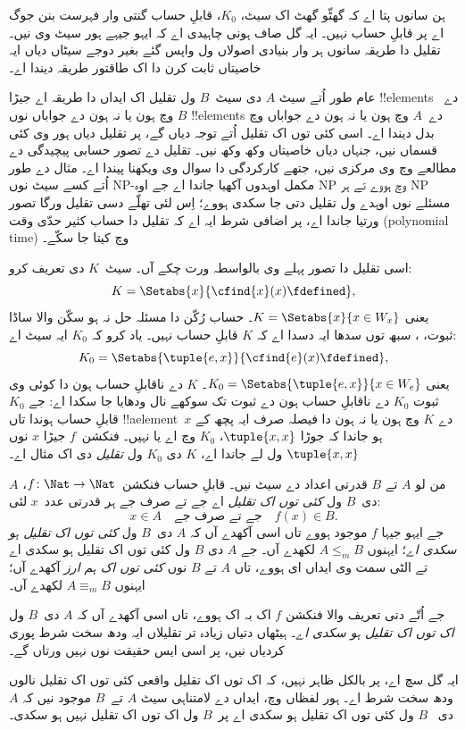 \documentclass[../../../include/open-logic-section]{subfiles}
\begin{document}

\begin{explain}
ہن سانوں پتا اے کہ گھٹّو گھٹ اک سیٹ،
$K_0$، قابلِ حساب گنتی وار فہرست بنن جوگ
اے پر قابلِ حساب نہیں۔ ایہ گل صاف ہونی
چاہیدی اے کہ ایہو جیہے ہور سیٹ وی نیں۔ تقلیل دا طریقہ
سانوں ہر وار بنیادی اصولاں ول واپس گئے
بغیر دوجے سیٹاں دیاں ایہ خاصیتاں ثابت
کرن دا اک طاقتور طریقہ دیندا اے۔

عام طور اُتے سیٹ $A$ دی سیٹ~$B$ ول
تقلیل اک ایداں دا طریقہ اے جیڑا
!!{element}s دے~$B$ وچ ہون یا نہ ہون
دے جواباں نوں !!{element}s دے~$A$ وچ ہون
یا نہ ہون دے جواباں وچ بدل دیندا اے۔
اسی کئی توں اک تقلیل اُتے توجہ
دیاں گے، پر تقلیل دیاں ہور وی کئی قسماں
نیں، جنہاں دیاں خاصیتاں وکھ وکھ نیں۔
تقلیل دے تصور حسابی پیچیدگی دے مطالعے
وچ وی مرکزی نیں، جتھے کارکردگی دا سوال
وی ویکھنا پیندا اے۔ مثال دے طور اُتے
کسے سیٹ نوں NP-مکمل اوہدوں آکھیا
جاندا اے جے اوہ NP وچ ہووے تے ہر NP
مسئلے نوں اوہدے ول تقلیل دتی جا سکدی
ہووے؛ اِس لئی تھلّے دسی تقلیل ورگا
تصور ورتیا جاندا اے، پر اضافی شرط ایہ
اے کہ تقلیل دا حساب کثیر حدّی وقت
(polynomial time) وچ کیتا جا سکّے۔

اسی تقلیل دا تصور پہلے وی بالواسطہ
ورت چکے آں۔ سیٹ~$K$ دی تعریف کرو:
\[
K = \Setabs{x}{\cfind{x}(x) \fdefined},
\]
یعنی $K = \Setabs{x}{x \in W_x}$۔
حساب رُکّن دا مسئلہ حل نہ ہو سکّن
والا ساڈا ثبوت، ،
سبھ توں سدھا ایہ دسدا اے کہ $K$ قابلِ
حساب نہیں۔ یاد کرو کہ $K_0$ ایہ سیٹ اے:
\[
K_0 = \Setabs{\tuple{e, x}}{\cfind{e}(x) \fdefined },
\]
یعنی $K_0 = \Setabs{\tuple{e,x}}{x \in W_e}$۔
$K$ دے ناقابلِ حساب ہون دا کوئی وی
ثبوت $K_0$ دے ناقابلِ حساب ہون دے
ثبوت تک سوکھے نال ودھایا جا سکدا اے:
جے $K_0$ قابلِ حساب ہوندا تاں
!!a{element}~$x$ دے $K$ وچ ہون
یا نہ ہون دا فیصلہ صرف ایہ پچھ کے
ہو جاندا کہ جوڑا $\tuple{x, x}$،
$K_0$ وچ اے یا نہیں۔ فنکشن~$f$
جیڑا $x$ نوں $\tuple{x, x}$ ول
لے جاندا اے، $K$ دی $K_0$ ول
\emph{تقلیل} دی اک مثال اے۔
\end{explain}

\begin{defn}
من لو $A$ تے $B$ قدرتی اعداد دے
سیٹ نیں۔ قابلِ حساب فنکشن~$f\colon
\Nat \to \Nat$، $A$ دی~$B$ ول
\emph{کئی توں اک تقلیل} اے جے تے
صرف جے ہر قدرتی عدد~$x$ لئی:
\[
x \in A \quad \text{جے تے صرف جے} \quad f(x) \in B.
\]
جے ایہو جیہا $f$ موجود ہووے تاں
اسی آکھدے آں کہ $A$ دی~$B$ ول
\emph{کئی توں اک تقلیل ہو سکدی اے}؛
ایہنوں $A \leq_m B$ لکھدے آں۔
جے $A$ دی $B$ ول کئی توں اک تقلیل
ہو سکدی اے تے الٹی سمت
وی ایداں ای ہووے، تاں $A$ تے $B$ نوں
\emph{کئی توں اک ہم ارز} آکھدے آں؛
ایہنوں $A \equiv_m B$ لکھدے آں۔
\end{defn}

جے اُتّے دتی تعریف والا فنکشن $f$
اک بہ اک ہووے، تاں اسی آکھدے آں کہ $A$ دی~$B$ ول
\emph{اک توں اک تقلیل ہو سکدی اے}۔ ہیٹھاں دتیاں زیادہ تر
تقلیلاں ایہ ودھ سخت شرط پوری کردیاں
نیں، پر اسی ایس حقیقت نوں نہیں ورتاں گے۔

\begin{digress}
ایہ گل سچ اے، پر بالکل ظاہر نہیں،
کہ اک توں اک تقلیل واقعی کئی توں اک
تقلیل نالوں ودھ سخت شرط اے۔ ہور
لفظاں وچ، ایداں دے لامتناہی سیٹ
$A$ تے~$B$ موجود نیں کہ $A$ دی
~$B$ ول کئی توں اک تقلیل ہو
سکدی اے پر~$B$ ول اک توں اک
تقلیل نہیں ہو سکدی۔
\end{digress}
\end{document}
